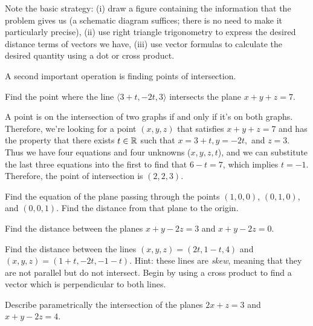 \documentclass{watsonbook}
\begin{document}
Note the basic strategy: (i) draw a figure containing the information that
the problem gives us (a schematic diagram suffices; there is no need
to make it particularly precise), (ii) use right triangle trigonometry to
express the desired distance terms of vectors we have, (iii) use
vector formulas to calculate the desired quantity using a dot or cross
product.

A second important operation is finding points of intersection. 

\begin{example}{}{}
  Find the point where the line $\langle 3 + t, -2t , 3 \rangle$
  intersects the plane $x + y + z = 7$. 
\end{example}

\begin{solution}
  A point is on the intersection of two graphs if and only if it's on
  both graphs. Therefore, we're looking for a point $(x,y,z)$ that
  satisfies $x + y + z = 7$ and has the property that there exists
  $t\in \mathbb{R}$ such that $x = 3 + t, y = -2t,$ and $z=3$. Thus we have
  four equations and four unknowns ($x,y,z,t$), and we can substitute
  the last three equations into the first to find that $6-t = 7$,
  which implies $t = -1$. Therefore, the point of intersection is
  $(2,2,3)$.
\end{solution}

\begin{exercise}{}{}
  Find the equation of the plane passing through the points $(1,0,0)$,
  $(0,1,0)$, and $(0,0,1)$. Find the distance from that plane to the
  origin. 
\end{exercise}

\begin{exercise}{}{}
  Find the distance between the planes $x+y-2z = 3$ and $x+y-2z = 0$. 
\end{exercise}

\begin{exercise}{}{}
  Find the distance between the lines $(x,y,z) = (2t, 1-t, 4)$ and
  $(x,y,z) = (1 + t, -2t, -1-t)$. Hint: these lines are \textit{skew},
  meaning that they are not parallel but do not intersect. Begin by
  using a cross product to find a vector which is perpendicular to
  both lines. 
\end{exercise}

\begin{exercise}{}{}
  Describe parametrically the intersection of the planes $2x + z = 3$
  and $x + y - 2z = 4$.
\end{exercise}
\end{document}
